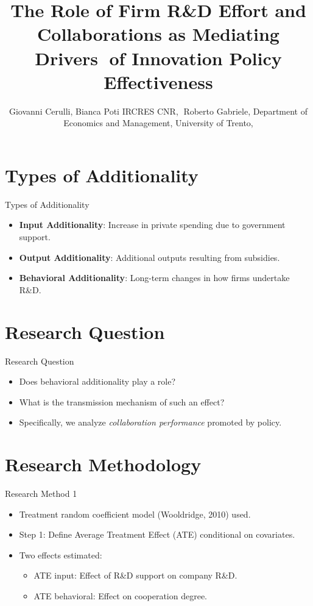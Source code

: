 \documentclass{beamer}
\title{The Role of Firm R\&D Effort and Collaborations as Mediating Drivers of Innovation Policy Effectiveness}
\author{Giovanni Cerulli, Bianca Poti
IRCRES CNR,   Roberto Gabriele, 
Department of Economics and Management, University of Trento,  }
\date{}
\begin{document}
\frame{\titlepage}


\section{Types of Additionality}
\begin{frame}{Types of Additionality}
    \begin{itemize}
        \item \textbf{Input Additionality}: Increase in private spending due to government support.
        \item \textbf{Output Additionality}: Additional outputs resulting from subsidies.
        \item \textbf{Behavioral Additionality}: Long-term changes in how firms undertake R\&D.
    \end{itemize}
\end{frame}

\section{Research Question}
\begin{frame}{Research Question}
    \begin{itemize}
        \item Does behavioral additionality play a role?
        \item What is the transmission mechanism of such an effect?
        \item Specifically, we analyze \textit{collaboration performance} promoted by policy.
    \end{itemize}
\end{frame}

\section{Research Methodology}
\begin{frame}{Research Method 1}
    \begin{itemize}
        \item Treatment random coefficient model (Wooldridge, 2010) used.
        \item Step 1: Define Average Treatment Effect (ATE) conditional on covariates.
        \item Two effects estimated:
        \begin{itemize}
            \item ATE input: Effect of R\&D support on company R\&D.
            \item ATE behavioral: Effect on cooperation degree.
        \end{itemize}
    \end{itemize}
\end{frame}
\end{document}
